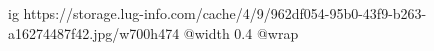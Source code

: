  
 
 
 
 

\ifcmt
  ig https://storage.lug-info.com/cache/4/9/962df054-95b0-43f9-b263-a16274487f42.jpg/w700h474
  @width 0.4
  @wrap 
\fi
